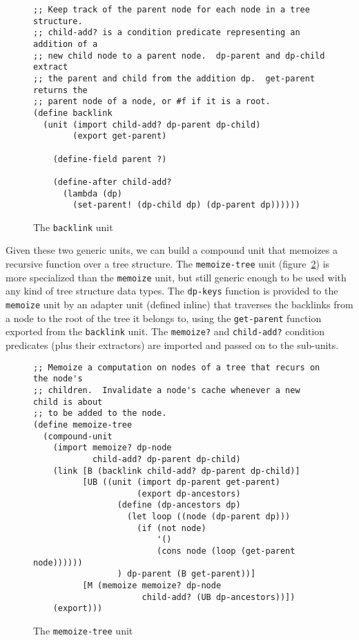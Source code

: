 \documentclass{article}
\newcommand{\code}[1]{\texttt{#1}}
\begin{document}
\begin{figure}
\caption{The \code{backlink} unit}
\label{backlink}
\begin{verbatim}
;; Keep track of the parent node for each node in a tree structure.
;; child-add? is a condition predicate representing an addition of a
;; new child node to a parent node.  dp-parent and dp-child extract
;; the parent and child from the addition dp.  get-parent returns the
;; parent node of a node, or #f if it is a root.
(define backlink
  (unit (import child-add? dp-parent dp-child)
        (export get-parent)

    (define-field parent ?)

    (define-after child-add?
      (lambda (dp)
        (set-parent! (dp-child dp) (dp-parent dp))))))
\end{verbatim}
\end{figure}

Given these two generic units, we can build a compound unit that
memoizes a recursive function over a tree structure.  The
\code{memoize-tree} unit (figure~\ref{memoize-tree}) is
more specialized than the \code{memoize} unit, but still generic
enough to be used with any kind of tree structure data types.  The
\code{dp-keys} function is provided to the \code{memoize} unit by an
adapter unit (defined inline) that traverses the backlinks from a node
to the root of the tree it belongs to, using the \code{get-parent}
function exported from the \code{backlink} unit.  The \code{memoize?} 
and \code{child-add?} condition predicates (plus their extractors) are
imported and passed on to the sub-units.

\begin{figure}
\caption{The \code{memoize-tree} unit}
\label{memoize-tree}
\begin{verbatim}
;; Memoize a computation on nodes of a tree that recurs on the node's
;; children.  Invalidate a node's cache whenever a new child is about
;; to be added to the node.
(define memoize-tree
  (compound-unit
    (import memoize? dp-node
            child-add? dp-parent dp-child)
    (link [B (backlink child-add? dp-parent dp-child)]
          [UB ((unit (import dp-parent get-parent)
                     (export dp-ancestors)
                 (define (dp-ancestors dp)
                   (let loop ((node (dp-parent dp)))
                     (if (not node)
                         '()
                         (cons node (loop (get-parent node))))))
                 ) dp-parent (B get-parent))]
          [M (memoize memoize? dp-node
                      child-add? (UB dp-ancestors))])
    (export)))
\end{verbatim}
\end{figure}
\end{document}
